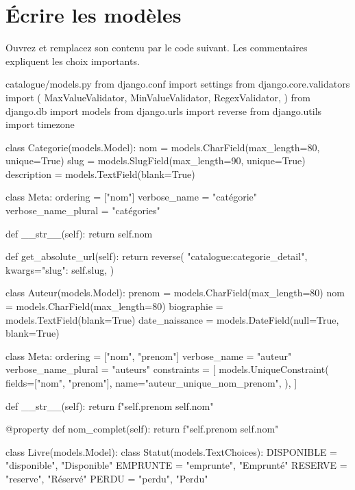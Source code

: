 \section{Écrire les modèles}

Ouvrez  et remplacez son contenu par le code suivant.
Les commentaires expliquent les choix importants.

\begin{codebox}[python]{catalogue/models.py}
from django.conf import settings
from django.core.validators import (
    MaxValueValidator,
    MinValueValidator,
    RegexValidator,
)
from django.db import models
from django.urls import reverse
from django.utils import timezone


class Categorie(models.Model):
    nom = models.CharField(max_length=80, unique=True)
    slug = models.SlugField(max_length=90, unique=True)
    description = models.TextField(blank=True)

    class Meta:
        ordering = ["nom"]
        verbose_name = "catégorie"
        verbose_name_plural = "catégories"

    def __str__(self):
        return self.nom

    def get_absolute_url(self):
        return reverse(
            "catalogue:categorie_detail",
            kwargs={"slug": self.slug},
        )


class Auteur(models.Model):
    prenom = models.CharField(max_length=80)
    nom = models.CharField(max_length=80)
    biographie = models.TextField(blank=True)
    date_naissance = models.DateField(null=True, blank=True)

    class Meta:
        ordering = ["nom", "prenom"]
        verbose_name = "auteur"
        verbose_name_plural = "auteurs"
        constraints = [
            models.UniqueConstraint(
                fields=["nom", "prenom"],
                name="auteur_unique_nom_prenom",
            ),
        ]

    def __str__(self):
        return f"{self.prenom} {self.nom}"

    @property
    def nom_complet(self):
        return f"{self.prenom} {self.nom}"


class Livre(models.Model):
    class Statut(models.TextChoices):
        DISPONIBLE = "disponible", "Disponible"
        EMPRUNTE = "emprunte", "Emprunté"
        RESERVE = "reserve", "Réservé"
        PERDU = "perdu", "Perdu"


\end{codebox}

